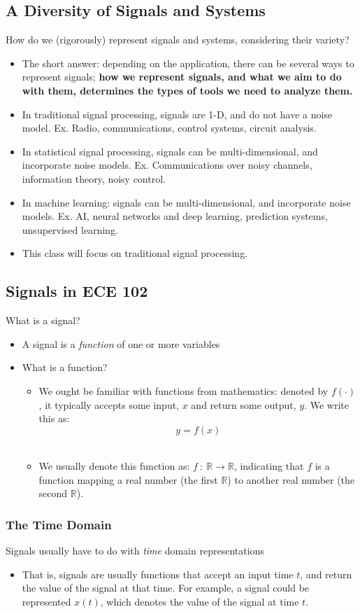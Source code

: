 \documentclass[10pt]{article}
\begin{document}
\subsection*{A Diversity of Signals and Systems}
How do we (rigorously) represent signals and systems, considering their variety?
\begin{itemize}
    \item The short answer: depending on the application, there can be several ways to represent signals; \textbf{how we represent signals, and what we aim to do with them, determines the types of tools we need to analyze them.}
    \item In traditional signal processing, signals are 1-D, and do not have a noise model.  Ex. Radio, communications, control systems, circuit analysis.
    \item In statistical signal processing, signals can be multi-dimensional, and incorporate noise models.  Ex. Communications over noisy channels, information theory, noisy control.
    \item In machine learning: signals can be multi-dimensional, and incorporate noise models.  Ex. AI, neural networks and deep learning, prediction systems, unsupervised learning.
    \item This class will focus on traditional signal processing.
\end{itemize}
\subsection*{Signals in ECE 102}
What is a signal?
\begin{itemize}
    \item A signal is a \textit{function} of one or more variables
    \item What is a function?
    \begin{itemize}
        \item We ought be familiar with functions from mathematics: denoted by $f(\cdot)$, it typically accepts some input, $x$ and return some output, $y$.  We write this as:
        \[y = f(x)\]\
        \item We usually denote this function as: $f \::\: \mathbb{R} \rightarrow \mathbb{R}$, indicating that $f$ is a function mapping a real number (the first $\mathbb{R}$) to another real number (the second $\mathbb{R}$).
    \end{itemize}
\end{itemize}
\subsubsection*{The Time Domain}
Signals usually have to do with \textit{time} domain representations
\begin{itemize}
    \item That is, signals are usually functions that accept an input time $t$, and return the value of the signal at that time.  For example, a signal could be represented $x(t)$, which denotes the value of the signal at time $t$.
\end{itemize}
\end{document}
